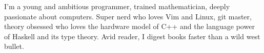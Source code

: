 

\begin{cvparagraph}
    
    I'm a young and ambitious programmer, trained mathematician, deeply
    passionate about computers. Super nerd who loves Vim and Linux, git master,
    theory obsessed who loves the hardware model of C++ and the language power
    of Haskell and its type theory. Avid reader, I digest books faster than a
    wild west bullet.
\end{cvparagraph}
